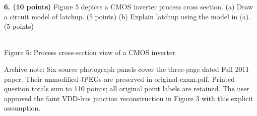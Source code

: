 \documentclass[10pt]{article}
\begin{document}
\textbf{6. (10 points)} Figure 5 depicts a CMOS inverter process cross section. (a) Draw a circuit model of latchup. (5 points) (b) Explain latchup using the model in (a). (5 points)
\begin{center}\\Figure 5: Process cross-section view of a CMOS inverter.\end{center}
\small Archive note: Six source photograph panels cover the three-page dated Fall 2011 paper. Their unmodified JPEGs are preserved in original-exam.pdf. Printed question totals sum to 110 points; all original point labels are retained. The user approved the faint VDD-bus junction reconstruction in Figure 3 with this explicit assumption.
\end{document}
